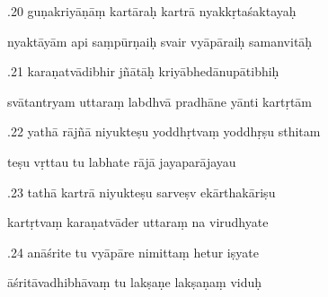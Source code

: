 \documentclass[article,12pt,a4paper]{memoir}%
\newcounter{parCount}
\begin{document}
	  
	  \pstart {}.20 guṇakriyāṇāṃ kartāraḥ kartrā nyakkṛtaśaktayaḥ 
	{}
	\pend%
      

	  
	  \pstart \leavevmode%
	nyaktāyām api saṃpūrṇaiḥ svair vyāpāraiḥ samanvitāḥ 
	{}
	\pend%
      

	  
	  \pstart {}.21 karaṇatvādibhir jñātāḥ kriyābhedānupātibhiḥ 
	{}
	\pend%
      

	  
	  \pstart \leavevmode%
	svātantryam uttaraṃ labdhvā pradhāne yānti kartṛtām 
	{}
	\pend%
      

	  
	  \pstart {}.22 yathā rājñā niyukteṣu yoddhṛtvaṃ yoddhṛṣu sthitam 
	{}
	\pend%
      

	  
	  \pstart \leavevmode%
	teṣu vṛttau tu labhate rājā jayaparājayau 
	{}
	\pend%
      

	  
	  \pstart {}.23 tathā kartrā niyukteṣu sarveṣv ekārthakāriṣu 
	{}
	\pend%
      

	  
	  \pstart \leavevmode%
	kartṛtvaṃ karaṇatvāder uttaraṃ na virudhyate 
	{}
	\pend%
      

	  
	  \pstart {}.24 anāśrite tu vyāpāre nimittaṃ hetur iṣyate 
	{}
	\pend%
      

	  
	  \pstart \leavevmode%
	āśritāvadhibhāvaṃ tu lakṣaṇe lakṣaṇaṃ viduḥ 
	{}
	\pend%
      
\end{document}
